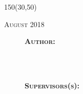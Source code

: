 \begin{titlepage}
\begin{center}

\large

\setlength{\TPHorizModule}{1mm}
\setlength{\TPVertModule}{\TPHorizModule}
\newlength{\backupparindent}
\setlength{\backupparindent}{\parindent}
\setlength{\parindent}{0mm}			
\begin{textblock}{150}(30,50)
    \vspace*{15mm}
    \Huge
    \vspace{4cm}
    \textcolor{OpenlabBlue}{\textbf{\doctitle }}\\
    \Large
    \vspace*{5mm}


    \begin{flushleft}
        \textcolor{OpenlabDarkBlue}{\textsc{August 2018}}\\
        \large
	
    \end{flushleft}
    \vspace*{1in}
    \begin{figure}
        \raggedleft
    \begin{minipage}[r]{0.2 \textwidth} %
   \begin{flushleft}                     %
	\textsc{\textbf{Author:}}\\
    \me\\\bigskip\bigskip

   \normalsize
    \department\\\bigskip\bigskip
    
    \textsc{\textbf{Supervisors(s):}}\\\medskip
    \firstCommitteeMember\\
    \secondCommitteeMember\\
   \end{flushleft}


\end{minipage}
\end{figure}
\end{textblock}
\end{center}
\end{titlepage}
